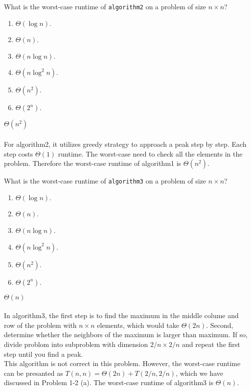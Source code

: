 \documentclass[12pt,twoside]{article}
\begin{document}
\begin{problems}
\begin{problemparts}
\problempart {} What is the worst-case runtime of \texttt{algorithm2} on a problem of size $n \times n$?
\begin{enumerate}
\item $\Theta(\log n)$.
\item $\Theta(n)$.
\item $\Theta(n \log n)$.
\item $\Theta(n \log^2 n)$.
\item $\Theta(n^2)$.
\item $\Theta(2^n)$.
\end{enumerate}

\ifsolution \solution{}
{\color{blue}$\Theta(n^2)$
\\
\\
For algorithm2, it utilizes greedy strategy to approach a peak  step by step. Each step costs $\Theta(1)$ runtime.
The worst-case need to check all the elements in the problem. Therefore the worst-case runtime of algorithm1 is 
$\Theta(n^2)$.}
\\
\fi

\problempart {} What is the worst-case runtime of \texttt{algorithm3} on a problem of size $n \times n$?
\begin{enumerate}
\item $\Theta(\log n)$.
\item $\Theta(n)$.
\item $\Theta(n \log n)$.
\item $\Theta(n \log^2 n)$.
\item $\Theta(n^2)$.
\item $\Theta(2^n)$.
\end{enumerate}

\ifsolution \solution{}
{\color{blue}$\Theta(n)$
\\
\\
In algorithm3, the first step is to find the maximum in the middle colume and row of the problem with $n\times n$ elements,
which would take $\Theta(2n)$. Second, determine whether the neighbors of the maximum is larger than maximum. If so, 
divide problom into subproblem with dimension $2/n\times2/n$ and repeat the first step until you find a peak.
\\
This algorithm is not correct in this problem. However, the worst-case runtime can be presanted as $T(n,n) = \Theta(2n) +
T(2/n,2/n)$, which we have discussed in Problem 1-2 (a). The worst-case runtime of algorithm3 is $\Theta(n)$.}
\\


\end{problemparts}
\end{problems}
\end{document}
